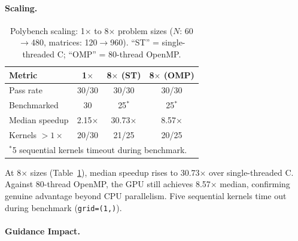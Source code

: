 \paragraph{Scaling.}

\begin{table}[t]
  \caption{Polybench scaling: 1$\times$ to 8$\times$ problem sizes
    ($N$: 60$\to$480, matrices: 120$\to$960).
    ``ST'' = single-threaded C; ``OMP'' = 80-thread OpenMP.}
  \label{tab:results_8x}
  \centering\small
  \begin{tabular}{lccc}
    \toprule
    \textbf{Metric} & \textbf{1$\times$} & \textbf{8$\times$ (ST)} & \textbf{8$\times$ (OMP)} \\
    \midrule
    Pass rate          & 30/30        & 30/30         & 30/30        \\
    Benchmarked        & 30           & 25$^*$        & 25$^*$       \\
    Median speedup     & 2.15$\times$ & 30.73$\times$ & 8.57$\times$ \\
    Kernels $>1\times$ & 20/30        & 21/25         & 20/25        \\
    \bottomrule
    \multicolumn{4}{l}{\scriptsize $^*$5 sequential kernels timeout during benchmark.}
  \end{tabular}
\end{table}

At 8$\times$ sizes (Table~\ref{tab:results_8x}), median speedup
rises to 30.73$\times$ over single-threaded C.  Against 80-thread
OpenMP, the GPU still achieves 8.57$\times$ median, confirming
genuine advantage beyond CPU parallelism.  Five sequential kernels
time out during benchmark (\texttt{grid=(1,)}).

\paragraph{Guidance Impact.}

